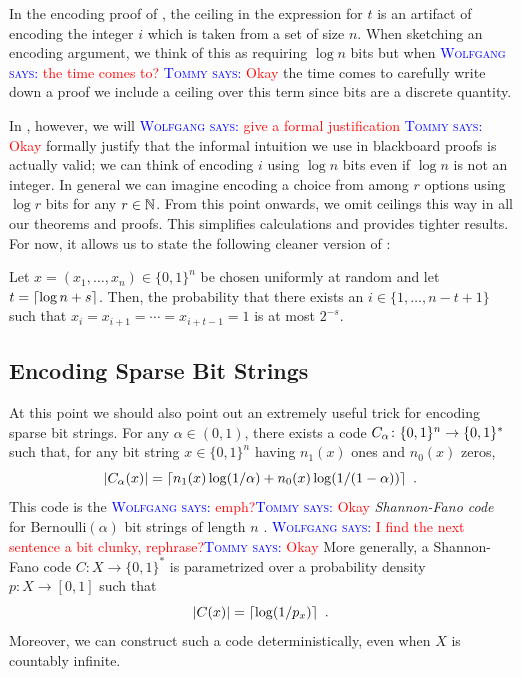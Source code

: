 \documentclass{patmorin}
\newenvironment{customthm}[1]
  {\renewcommand\theinnercustomthm{#1}\innercustomthm}
  {\endinnercustomthm}
\newcommand{\aremark}[3]{\textcolor{blue}{\textsc{#1 #2:}}
  \textcolor{red}{\textsf{#3}}}
\newcommand{\tommy}[2][says]{\aremark{Tommy}{#1}{#2}}
\newcommand{\wolfgang}[2][says]{\aremark{Wolfgang}{#1}{#2}}
\begin{document}
In the encoding proof of , the ceiling in the
expression for $t$ is an artifact of encoding the integer $i$ which is
taken from a set of size $n$. When sketching an encoding argument, we
think of this as requiring $\log n$ bits but when \wolfgang{the time
  comes to?} \tommy{Okay} the time comes to carefully write down a
proof we include a ceiling over this term since bits are a discrete
quantity.

In , however, we will \wolfgang{give a formal
  justification} \tommy{Okay} formally justify that the informal
intuition we use in blackboard proofs is actually valid; we can think
of encoding $i$ using $\log n$ bits even if $\log n$ is not an
integer.  In general we can imagine encoding a choice from among $r$
options using $\log r$ bits for any $r\in\mathbb{N}$.  From this point
onwards, we omit ceilings this way in all our theorems and
proofs. This simplifies calculations and provides tighter results.
For now, it allows us to state the following cleaner version of
:

\begin{customthm}{\ref*{thm:runs-i}b}
  Let $x=(x_1,\ldots,x_n)\in\{0,1\}^n$ be chosen uniformly at random
  and let $t = {\lceil \log n + s \rceil}$. Then, the probability that there
  exists an $i\in\{1,\ldots,n-t+1\}$ such that
  $x_i=x_{i+1}=\cdots=x_{i+t-1}=1$ is at most $2^{-s}$.
\end{customthm}

\subsection{Encoding Sparse Bit Strings}

At this point we should also point out an extremely useful trick 
for encoding sparse bit strings. For any $\alpha\in(0,1)$,
there exists a code $C_\alpha\colon \{0,1\}^n\rightarrow \{0,1\}^*$
such that, for any bit string $x\in\{0,1\}^n$ having $n_1(x)$ ones and
$n_0(x)$ zeros,
\begin{equation}
  |C_\alpha(x)| = \lceil n_1(x)\log(1/\alpha) + n_0(x)\log(1/(1-\alpha)) \rceil \enspace .
  \eqlabel{sparse-bitstring-i}
\end{equation}
This code is the \wolfgang{emph?}\tommy{Okay} \emph{Shannon-Fano code}
for $\mathrm{Bernoulli}(\alpha)$ bit strings of length $n$
\cite{fano:transmission,shannon:mathematical}. \wolfgang{I find the
  next sentence a bit clunky, rephrase?}\tommy{Okay} More generally, a
Shannon-Fano code $C : X \to \{0, 1\}^*$ is parametrized over a
probability density $p : X \to [0, 1]$ such that
\[
  |C(x)| = {\lceil \log (1/p_x) \rceil} \enspace .
\]
Moreover, we can construct such a code deterministically, even when
$X$ is countably infinite.
\end{document}
